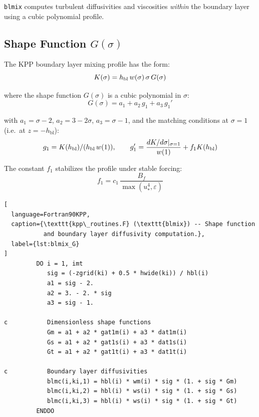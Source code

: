 \documentclass[12pt,letterpaper]{article}
\newcommand{\hbl}{h_{\mathrm{bl}}}
\newcommand{\ustar}{u_*}
\begin{document}
\texttt{blmix} computes turbulent diffusivities and viscosities  
\textit{within} the boundary layer using a cubic polynomial profile.  
  
\subsection{Shape Function $G(\sigma)$}  
  
The KPP boundary layer mixing profile has the form:  
\begin{equation}  
K(\sigma) = h_{\rm bl}\,w(\sigma)\,\sigma\,G(\sigma)  
\end{equation}  
  
where the shape function $G(\sigma)$ is a cubic polynomial in $\sigma$:  
\begin{equation}  
G(\sigma) = a_1 + a_2\,g_1 + a_3\,g_1'  
\end{equation}  
  
with $a_1 = \sigma - 2$, $a_2 = 3 - 2\sigma$, $a_3 = \sigma - 1$,  
and the matching conditions at $\sigma = 1$ (i.e.\ at $z = -\hbl$):  
\begin{equation}  
g_1 = K(\hbl)/(h_{\rm bl}\,w(1)),  
\qquad  
g_1' = \frac{dK/d\sigma|_{\sigma=1}}{w(1)} + f_1 K(\hbl)  
\end{equation}  
  
The constant $f_1$ stabilizes the profile under stable forcing:  
\begin{equation}  
f_1 = c_1\,\frac{B_f}{\max(\ustar^4, \varepsilon)}  
\end{equation}  
  
\begin{lstlisting}[  
  language=Fortran90KPP,  
  caption={\texttt{kpp\_routines.F} (\texttt{blmix}) -- Shape function  
           and boundary layer diffusivity computation.},  
  label={lst:blmix_G}  
]  
         DO i = 1, imt  
            sig = (-zgrid(ki) + 0.5 * hwide(ki)) / hbl(i)  
            a1 = sig - 2.  
            a2 = 3. - 2. * sig  
            a3 = sig - 1.  
  
c           Dimensionless shape functions  
            Gm = a1 + a2 * gat1m(i) + a3 * dat1m(i)  
            Gs = a1 + a2 * gat1s(i) + a3 * dat1s(i)  
            Gt = a1 + a2 * gat1t(i) + a3 * dat1t(i)  
  
c           Boundary layer diffusivities  
            blmc(i,ki,1) = hbl(i) * wm(i) * sig * (1. + sig * Gm)  
            blmc(i,ki,2) = hbl(i) * ws(i) * sig * (1. + sig * Gs)  
            blmc(i,ki,3) = hbl(i) * ws(i) * sig * (1. + sig * Gt)  
         ENDDO  
\end{lstlisting}  
  
\end{document}
